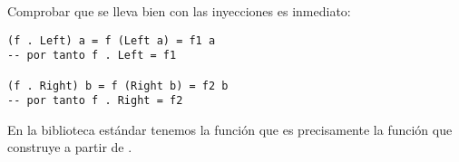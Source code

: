 Comprobar que se lleva bien con las inyecciones es inmediato:
\begin{verbatim}
(f . Left) a = f (Left a) = f1 a
-- por tanto f . Left = f1

(f . Right) b = f (Right b) = f2 b
-- por tanto f . Right = f2
\end{verbatim}

En la biblioteca estándar tenemos la función
que es precisamente la función que construye  a partir
de .
